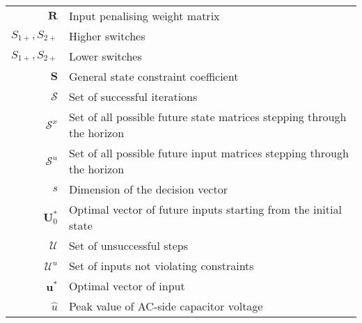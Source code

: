 \begin{scriptsize}
\begin{tabularx}{\textwidth}{r|X}
$\textbf{R}$                    & Input penalising weight matrix\\

$S_{1+},S_{2+}$										& Higher switches\\
$S_{1+},S_{2+}$										& Lower switches\\
$\textbf{S}$              & General state constraint coefficient\\
$\mathcal{S}$                   & Set of successful iterations\\
$\mathcal{S}^x$             & Set of all possible future state matrices stepping through the horizon\\
$\mathcal{S}^u$             & Set of all possible future input matrices stepping through the horizon\\
$s$                             & Dimension of the decision vector\\


$\textbf{U}^*_0$            & Optimal vector of future inputs starting from the initial state\\
$\mathcal{U}$              & Set of unsuccessful steps\\
$\mathcal{U}^u$             & Set of inputs not violating constraints\\
$\textbf{u}^*$            & Optimal vector of input\\
$\widehat{u}$				& Peak value of AC-side capacitor voltage\\


\end{tabularx}
\end{scriptsize}
